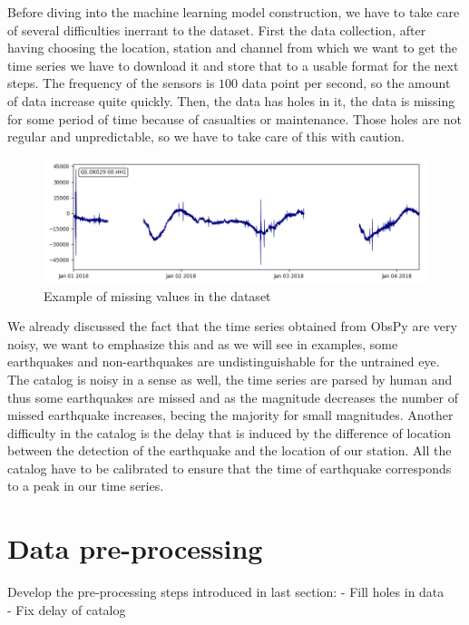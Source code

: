 \documentclass[10pt,conference,compsocconf]{IEEEtran}
\begin{document}
Before diving into the machine learning model construction, we have to take care of several difficulties inerrant to the dataset.\newline
First the data collection, after having choosing the location, station and channel from which we want to get the time series we have to download it and store that to a usable format for the next steps. The frequency of the sensors is $100$ data point per second, so the amount of data increase quite quickly. Then, the data has holes in it, the data is missing for some period of time because of casualties or maintenance. Those holes are not regular and unpredictable, so we have to take care of this with caution.

\begin{figure}[h]
  \centering
	\includegraphics[width=\columnwidth]{../processed-data/hole_example.png}
  \caption{Example of missing values in the dataset}
	\label{fig:10min-example}
\end{figure}

We already discussed the fact that the time series obtained from ObsPy are very noisy, we want to emphasize this and as we will see in examples, some earthquakes and non-earthquakes are undistinguishable for the untrained eye. The catalog is noisy in a sense as well, the time series are parsed by human and thus some earthquakes are missed and as the magnitude decreases the number of missed earthquake increases, becing the majority for small magnitudes. Another difficulty in the catalog is the delay that is induced by the difference of location between the detection of the earthquake and the location of our station. All the catalog have to be calibrated to ensure that the time of earthquake corresponds to a peak in our time series.

\section{Data pre-processing}
Develop the pre-processing steps introduced in last section:
- Fill holes in data\\
- Fix delay of catalog\\
\end{document}
